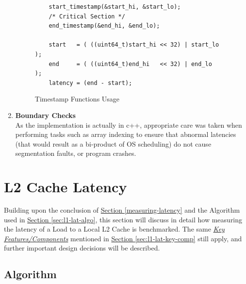 \documentclass[bsc,frontabs,twoside,singlespacing,parskip,deptreport]{infthesis}     %
\begin{document}
\begin{enumerate}
{\begin{figure}[h!]
\begin{verbatim}
    start_timestamp(&start_hi, &start_lo);
    /* Critical Section */
    end_timestamp(&end_hi, &end_lo);  
    
    start   = ( ((uint64_t)start_hi << 32) | start_lo );
    end     = ( ((uint64_t)end_hi   << 32) | end_lo   );
    latency = (end - start);
        \end{verbatim}
        \caption{Timestamp Functions Usage}
        \label{fig:timestamp_usage_l1}
    \end{figure}
    
    }
    \item{{\bf Boundary Checks} \\
    As the implementation is actually in c++, appropriate care was taken when performing tasks such as array indexing to ensure that abnormal latencies (that would result as a bi-product of OS scheduling) do not cause segmentation faults, or program crashes. }
\end{enumerate}



\newpage

\section{L2 Cache Latency}
Building upon the conclusion of \hyperref[measuring-latency]{Section \ref{measuring-latency}} and the Algorithm used in \hyperref[measuring-latency]{Section \ref{sec:l1-lat-algo}}, this section will discuss in detail how measuring the latency of a Load to a Local L2 Cache is benchmarked. The same \hyperref[sec:l1-lat-key-comp]{\emph{Key Features/Components}} mentioned in \hyperref[measuring-latency]{Section \ref{sec:l1-lat-key-comp}} still apply, and further important design decisions will be described.

\subsection{Algorithm}\label{sec:l2-lat-algo}
\end{document}
